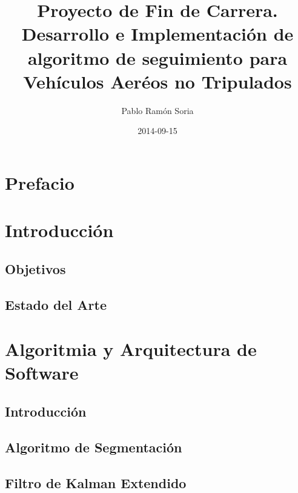 \documentclass[11pt, oneside]{book} %
\begin{document}
\frontmatter
\title{Proyecto de Fin de Carrera. \\ Desarrollo e Implementación de algoritmo de seguimiento para Vehículos Aeréos no Tripulados}
\author{Pablo Ram\'on Soria}
\date{2014-09-15}
\maketitle

\tableofcontents

\chapter{Prefacio}


\chapter{Introducci\'on}
\section{Objetivos}


\section{Estado del Arte}

\mainmatter

\chapter{Algoritmia y Arquitectura de Software}
\section{Introducci\'on}


\section{Algoritmo de Segmentaci\'on}


\section{Filtro de Kalman Extendido}

\end{document}
